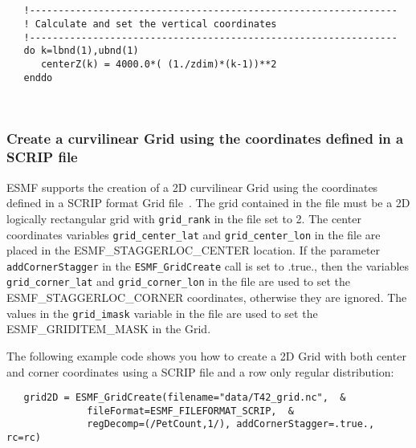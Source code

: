 
 \begin{verbatim}


   !----------------------------------------------------------------
   ! Calculate and set the vertical coordinates
   !----------------------------------------------------------------
   do k=lbnd(1),ubnd(1)
      centerZ(k) = 4000.0*( (1./zdim)*(k-1))**2
   enddo

 
\end{verbatim}
 

  \subsubsection{Create a curvilinear Grid using the coordinates defined
   in a SCRIP file}\label{sec:example:2DLogRecFromScrip}
  
   \begin{sloppypar}
   ESMF supports the creation of a 2D curvilinear Grid using the coordinates
   defined in a SCRIP format Grid file~\cite{ref:SCRIP}. The grid contained in the
   file must be a 2D logically rectangular grid with {\tt grid\_rank} in the file set
   to 2.  The center coordinates variables {\tt grid\_center\_lat} and {\tt grid\_center\_lon} in the file
   are placed in the ESMF\_STAGGERLOC\_CENTER location.  If the parameter {\tt addCornerStagger}
   in the {\tt ESMF\_GridCreate} call is set to .true., then
   the variables {\tt grid\_corner\_lat} and {\tt grid\_corner\_lon} in the file
   are used to set the ESMF\_STAGGERLOC\_CORNER coordinates, otherwise they are ignored.
   The values in the {\tt grid\_imask} variable in the file are used to set the ESMF\_GRIDITEM\_MASK in the Grid.
   \end{sloppypar}
  
   The following example code shows you how to create a 2D Grid with both center and corner coordinates
   using a SCRIP file and a row only regular distribution: 

 \begin{verbatim}
   grid2D = ESMF_GridCreate(filename="data/T42_grid.nc",  &
              fileFormat=ESMF_FILEFORMAT_SCRIP,  &
              regDecomp=(/PetCount,1/), addCornerStagger=.true., rc=rc)
 
\end{verbatim}
 
